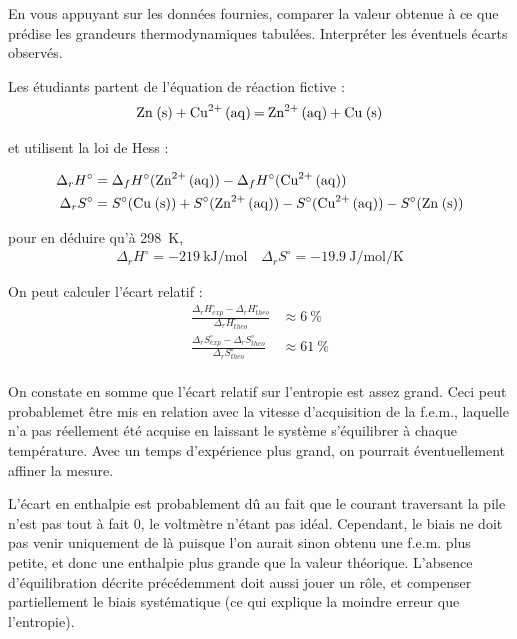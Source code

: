 \documentclass[twoside,a4paper,11pt,answers,addpoints]{exam}
\newcounter{foo} %
\begin{document}
\begin{questions}
\begin{framed}
\question[1] En vous appuyant sur les données fournies, comparer la valeur obtenue à ce que prédise les grandeurs thermodynamiques tabulées. Interpréter les éventuels écarts observés.


\begin{solution}
Les étudiants partent de l'équation de réaction fictive : 
\begin{align*}
\ce{Zn (s) +  Cu^{2+} (aq) = Zn^{2+} (aq) + Cu (s)}
\end{align*}

et utilisent la loi de Hess : 

\begin{align*}
\Delta_r H^\circ &= \Delta_f H^\circ ( \ce{Zn^{2+} (aq)} ) - \Delta_f H^\circ ( \ce{Cu^{2+} (aq)} ) \\
\Delta_r S^\circ &= S^\circ ( \ce{Cu (s)} ) + S^\circ ( \ce{Zn^{2+} (aq)} ) - S^\circ ( \ce{Cu^{2+} (aq)} ) - S^\circ ( \ce{Zn (s)} ) 
\end{align*}

pour en déduire qu'à \SI{298}{\kelvin}, 
\begin{align*}
\Delta_r H^\circ = - 219 ~ \si{\kilo\joule\per\mole} \quad \Delta_r S^\circ = -19.9 ~ \si{\joule\per\mole\per\kelvin}
\end{align*}

On peut calculer l'écart relatif :
\begin{align}
\frac{\Delta_r H^\circ_{exp} - \Delta_r H^\circ_{theo}}{\Delta_r H^\circ_{theo}} &\approx 6 ~ \si{\percent} \\
\frac{\Delta_r S^\circ_{exp} - \Delta_r S^\circ_{theo}}{\Delta_r S^\circ_{theo}} &\approx 61 ~ \si{\percent} \\
\end{align}

On constate en somme que l'écart relatif sur l'entropie est assez grand. Ceci peut probablemet être mis en relation avec la vitesse d'acquisition de la f.e.m., laquelle n'a pas réellement été acquise en laissant le système s'équilibrer à chaque température. Avec un temps d'expérience plus grand, on pourrait éventuellement affiner la mesure.

L'écart en enthalpie est probablement dû au fait que le courant traversant la pile n'est pas tout à fait $0$, le voltmètre n'étant pas idéal. Cependant, le biais ne doit pas venir uniquement de là puisque l'on aurait sinon obtenu une f.e.m. plus petite, et donc une enthalpie plus grande que la valeur théorique. L'absence d'équilibration décrite précédemment doit aussi jouer un rôle, et compenser partiellement le biais systématique (ce qui explique la moindre erreur que l'entropie).
\end{solution}
\end{framed}
\setcounter{foo}{\value{question}}
\end{questions}
\end{document}
